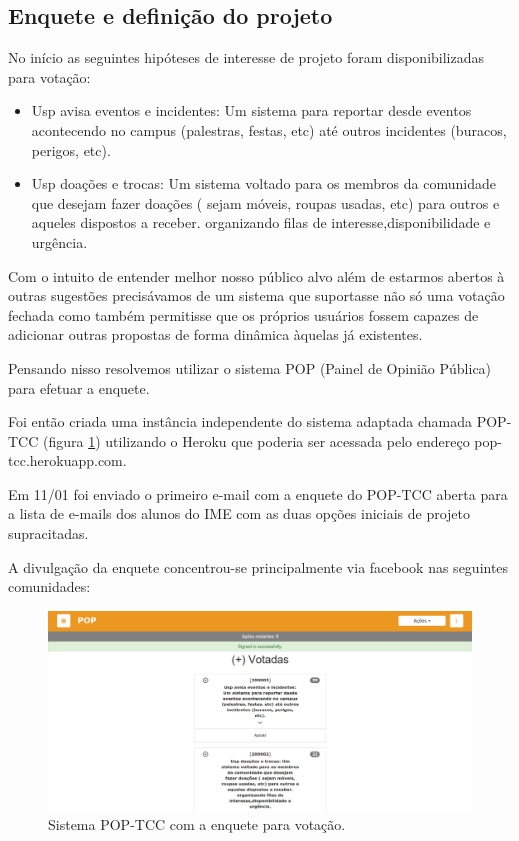 \subsection{Enquete e definição do projeto}
        \par  No início as seguintes hipóteses de interesse de projeto foram disponibilizadas para votação:
                \begin{itemize}
                \item {Usp avisa eventos e incidentes:} Um sistema para reportar desde eventos acontecendo no campus (palestras, festas, etc) até outros incidentes (buracos, perigos, etc).
                \item {Usp doações e trocas: } Um sistema voltado para os membros da comunidade que desejam fazer doações ( sejam móveis, roupas usadas, etc) para outros e aqueles dispostos a receber. organizando filas de interesse,disponibilidade e urgência.
                \end{itemize}
        \par Com o intuito de entender melhor nosso público alvo além de estarmos abertos à outras sugestões precisávamos de um sistema que suportasse não só uma votação fechada como também permitisse que os próprios usuários fossem capazes de adicionar outras propostas de forma dinâmica àquelas já existentes.
        \par Pensando nisso resolvemos utilizar o sistema POP (Painel de Opinião Pública) para efetuar a enquete.
        \par Foi então criada uma instância independente do sistema adaptada chamada POP-TCC (figura \ref{fig:pop-tcc}) utilizando o Heroku que poderia ser acessada pelo endereço pop-tcc.herokuapp.com. 
        \par Em 11/01 foi enviado o primeiro e-mail com a enquete do POP-TCC aberta para a lista de e-mails dos alunos do IME com as duas opções iniciais de projeto supracitadas. \par A divulgação da enquete concentrou-se principalmente via facebook nas seguintes comunidades:
\begin{figure}[htb]
\includegraphics[width=15cm]{figuras/pop-tcc}
\caption{\label{fig:pop-tcc} Sistema POP-TCC com a enquete para votação.}
\end{figure}
